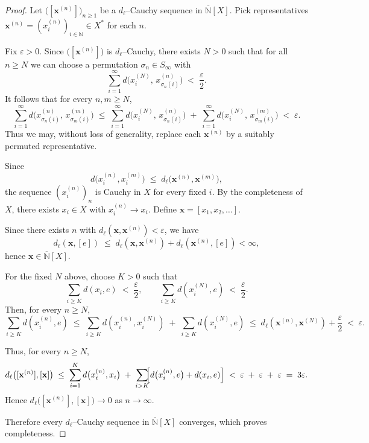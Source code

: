 \documentclass[10pt,a4paper]{article}
\theoremstyle{definition}
\newcommand{\N}{\mathbb{N}}
\begin{document}
\begin{proof}
Let $\bigl([\mathbf{x}^{(n)}]\bigr)_{n\ge1}$ be a $d_\ell$--Cauchy sequence in $\overline{\N}[X]$.
Pick representatives $\mathbf{x}^{(n)}=(x^{(n)}_i)_{i\in\N}\in X^\ast$ for each $n$.

Fix $\varepsilon > 0$.
Since $\bigl([\mathbf{x}^{(n)}]\bigr)$ is $d_\ell$--Cauchy, there exists $N > 0$ such that
for all $n \ge N$ we can choose a permutation $\sigma_{n}\in S_\infty$ with
\[
\sum_{i=1}^\infty d\!\bigl(x^{(N)}_i,\,x^{(n)}_{\sigma_{n}(i)}\bigr)
\;<\; \frac{\varepsilon}{2}.
\]
It follows that for every $n,m \geq N$,
\[
\sum_{i=1}^\infty d\!\bigl(x^{(n)}_{\sigma_{n}(i)},\,x^{(m)}_{\sigma_{m}(i)}\bigr)
\;\leq\; 
\sum_{i=1}^\infty d\!\bigl(x^{(N)}_i,\,x^{(n)}_{\sigma_{n}(i)}\bigr) \;+\;
\sum_{i=1}^\infty d\!\bigl(x^{(N)}_i,\,x^{(m)}_{\sigma_{m}(i)}\bigr)
\;<\; \varepsilon.
\]
Thus we may, without loss of generality, replace each $\mathbf{x}^{(n)}$ by a suitably permuted representative.

Since
\[
d\bigl(x^{(n)}_i, x^{(m)}_i \bigr) \;\leq\; d_\ell\bigl(\mathbf{x}^{(n)},\mathbf{x}^{(m)}\bigr),
\]
the sequence $(x^{(n)}_i)_{n}$ is Cauchy in $X$ for every fixed $i$. By the completeness of $X$, there exists $x_i \in X$ with $x^{(n)}_i \to x_i$. Define
$\mathbf{x}=[x_1,x_2,\ldots]$.

Since there exists $n$ with $d_\ell(\mathbf{x}, \mathbf{x}^{(n)}) < \varepsilon$, we have
\[
d_\ell(\mathbf{x}, [e]) \;\leq\; d_\ell(\mathbf{x}, \mathbf{x}^{(n)}) + d_\ell(\mathbf{x}^{(n)},[e]) < \infty,
\]
hence $\mathbf{x} \in \overline{\N}[X]$.

For the fixed $N$ above, choose $K > 0$ such that
\[
\sum_{i \geq K} d(x_i, e) \;<\; \frac{\varepsilon}{2}, 
\qquad
\sum_{i \geq K} d(x^{(N)}_i, e) \;<\; \frac{\varepsilon}{2}.
\]
Then, for every $n \geq N$,
\[
\sum_{i \geq K} d(x^{(n)}_i, e)
\;\leq\;
\sum_{i \geq K} d(x^{(n)}_i, x^{(N)}_i)
\;+\; \sum_{i \geq K} d(x^{(N)}_i, e)
\;\leq\; d_\ell(\mathbf{x}^{(n)},\mathbf{x}^{(N)}) + \frac{\varepsilon}{2} 
\;<\; \varepsilon.
\]

Thus, for every $n \geq N$,
\[
d_\ell\bigl([\mathbf{x}^{(n)}],[\mathbf{x}]\bigr)
\;\leq\;
\sum_{i=1}^{K} d\bigl(x^{(n)}_i,x_i\bigr)
\;+\; \sum_{i>K}\!\!\Bigl[d\bigl(x^{(n)}_i,e\bigr)+d(x_i,e)\Bigr]
\;<\; \varepsilon \;+\; \varepsilon \;+\; \varepsilon
\;=\; 3\varepsilon.
\]
Hence
$d_\ell\bigl([\mathbf{x}^{(n)}],[\mathbf{x}]\bigr)\to 0$ as $n\to\infty$.

\medskip
Therefore every $d_\ell$--Cauchy sequence in $\overline{\N}[X]$ converges, which proves completeness.
\end{proof}
\end{document}
